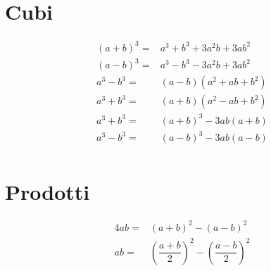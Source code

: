 \section{Cubi}
\begin{align*}
(a+b)^3={}&a^3+b^3+3a^2b+3ab^2\\
(a-b)^3={}&a^3-b^3-3a^2b+3ab^2\\
a^3-b^3={}&(a-b)(a^2+ab+b^2)\\
a^3+b^3={}&(a+b)(a^2-ab+b^2)\\
a^3+b^3={}&(a+b)^3-3ab(a+b)\\
a^3-b^3={}&(a-b)^3-3ab(a-b)\\
\end{align*}
\section{Prodotti}
\begin{align*}
4ab={}&(a+b)^2-(a-b)^2\\
ab={}&\left(\dfrac{a+b}{2}\right)^2-\left(\dfrac{a-b}{2}\right)^2\\
\end{align*}
